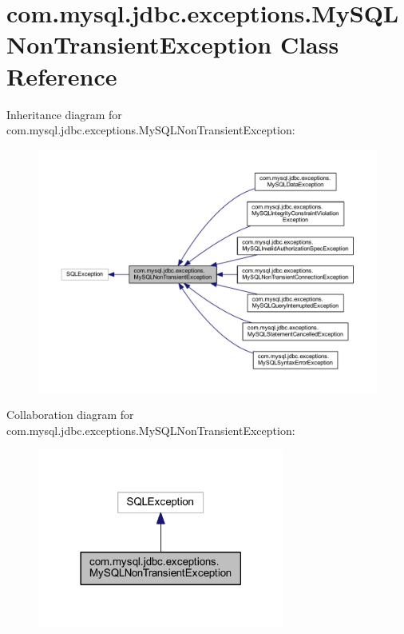 \hypertarget{classcom_1_1mysql_1_1jdbc_1_1exceptions_1_1_my_s_q_l_non_transient_exception}{}\section{com.\+mysql.\+jdbc.\+exceptions.\+My\+S\+Q\+L\+Non\+Transient\+Exception Class Reference}
\label{classcom_1_1mysql_1_1jdbc_1_1exceptions_1_1_my_s_q_l_non_transient_exception}


Inheritance diagram for com.\+mysql.\+jdbc.\+exceptions.\+My\+S\+Q\+L\+Non\+Transient\+Exception\+:
\nopagebreak
\begin{figure}[H]
\begin{center}
\leavevmode
\includegraphics[width=350pt]{classcom_1_1mysql_1_1jdbc_1_1exceptions_1_1_my_s_q_l_non_transient_exception__inherit__graph}
\end{center}
\end{figure}


Collaboration diagram for com.\+mysql.\+jdbc.\+exceptions.\+My\+S\+Q\+L\+Non\+Transient\+Exception\+:
\nopagebreak
\begin{figure}[H]
\begin{center}
\leavevmode
\includegraphics[width=230pt]{classcom_1_1mysql_1_1jdbc_1_1exceptions_1_1_my_s_q_l_non_transient_exception__coll__graph}
\end{center}
\end{figure}
